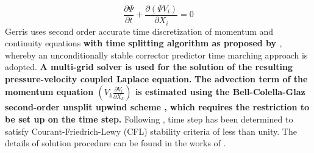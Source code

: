\documentclass{jfm}
\begin{document}
\begin{equation} \label{Equation::vof}
\frac{\partial \Psi}{\partial t} + \frac{\partial(\Psi V_i)}{\partial X_i} = 0
\end{equation}
Gerris uses second order accurate time discretization of momentum and continuity equations\textbf{ with time splitting algorithm as proposed by \cite{Chorin1968}}, whereby an unconditionally stable corrector predictor time marching approach is adopted. \textbf{A multi-grid solver is used for the solution of the resulting pressure-velocity coupled Laplace equation.} \textbf{The advection term of the momentum equation $\left(V_k\frac{\partial V_i}{\partial X_k}\right)$ is estimated using the Bell-Colella-Glaz second-order unsplit upwind scheme \citep{bell1989second}, which requires the restriction to be set up on the time step.} Following \cite{popinet2009}, time step has been determined to satisfy Courant-Friedrich-Lewy (CFL) stability criteria of less than unity. The details of solution procedure can be found in the works of \cite{Popinet2003,popinet2009}.\\
\end{document}
